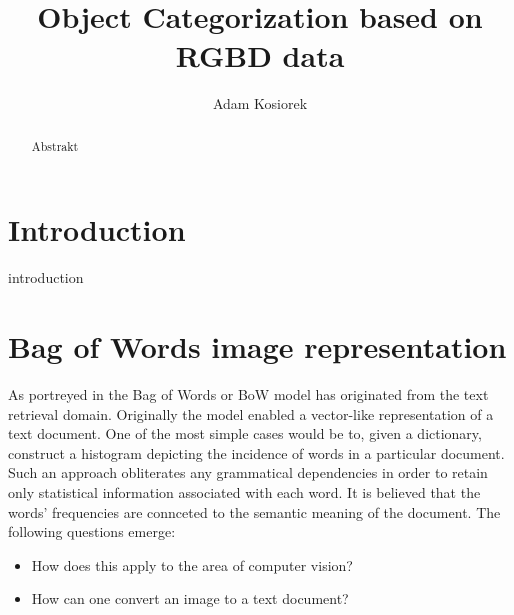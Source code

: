 \documentclass[a4paper,12pt]{article}
\title{Object Categorization based on RGBD data}
\author{Adam Kosiorek}
\begin{document}
\maketitle

\begin{abstract}

Abstrakt

\end{abstract}

%

\section{Introduction}

introduction

\section{Bag of Words image representation}

  As portreyed in \cite{tsai2012bag} the Bag of Words or BoW model has originated from the text retrieval domain. Originally the model enabled a vector-like representation of a text document. One of the most simple cases would be to, given a dictionary, construct a histogram depicting the incidence of words in a particular document. Such an approach obliterates any grammatical dependencies in order to retain only statistical information associated with each word. It is believed that the words' frequencies are connceted to the semantic meaning of the document. The following questions emerge: 
  
  \begin{itemize}
    \item How does this apply to the area of computer vision?
    \item How can one convert an image to a text document? 
  \end{itemize}
  
\end{document}
